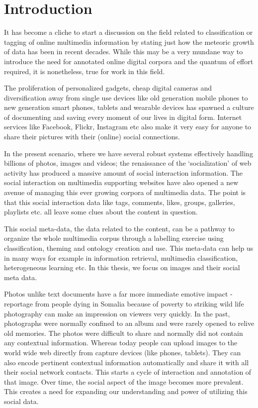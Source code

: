 \chapter{Introduction} %
\label{INTR} %
It has become a cliche to start a discussion on the field related to 
classification or tagging of online multimedia information by 
stating just how the meteoric growth of data has been in recent 
decades. While this may be a very mundane way to introduce the need 
for annotated online digital corpora and the quantum of effort 
required, it is nonetheless, true for work in this field.

The proliferation of personalized gadgets, cheap digital cameras and 
diversification away from single use devices like old generation mobile 
phones to new generation smart phones, tablets and wearable devices has
spawned a culture of documenting and saving every moment of our lives in 
digital form. Internet services like Facebook, Flickr, 
Instagram etc also make it very easy for anyone to share 
their pictures with their (online) social connections.

In the present scenario, where we have several robust systems 
effectively handling billions of photos, images and videos; the 
renaissance of the `socialization' of web activity has produced a 
massive amount of social interaction information. The social 
interaction on multimedia supporting websites have also opened a new 
avenue of managing this ever growing corpora of multimedia data. The 
point is that this social interaction data like tags, comments, likes, 
groups, galleries, playlists etc. all leave some clues about the 
content in question.

This social meta-data, the data related to the content, can be a 
pathway to organize the whole multimedia corpus through a labelling
exercise using classification, theming and ontology creation and use. 
This meta-data can help us in many ways for example in 
information retrieval, multimedia classification, heterogeneous 
learning etc. In this thesis, we focus on images and their social meta data.

Photos unlike text documents have a far more immediate 
emotive impact - reportage from people dying in Somalia because of 
poverty to striking wild life photography can make an impression on 
viewers very quickly. In the past, photographs were normally confined to 
an album and were rarely opened to relive old memories. The 
photos were difficult to share and normally did not contain any 
contextual information. Whereas today people can 
upload images to the world wide web directly from capture devices 
(like phones, tablets). They can also encode pertinent contextual 
information automatically and share it with all their social network 
contacts. This starts a cycle of interaction and annotation of that 
image. Over time, the social aspect of the image becomes more 
prevalent. This creates a need for expanding our understanding and 
power of utilizing this social data.

